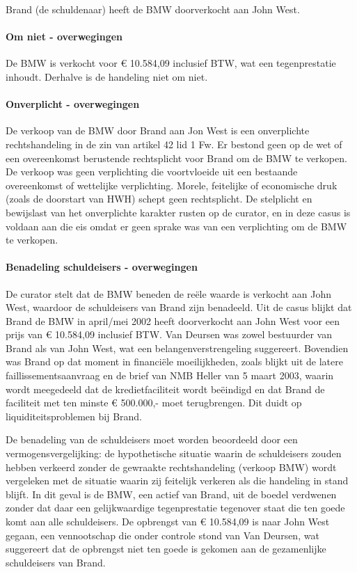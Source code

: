 \documentclass[
  dutch,
  a4paper,
]{article}
\begin{document}
Brand (de schuldenaar) heeft de BMW doorverkocht aan John West.

\paragraph{Om niet - overwegingen}\label{om-niet---overwegingen-60}

De BMW is verkocht voor € 10.584,09 inclusief BTW, wat een tegenprestatie inhoudt. Derhalve is de handeling niet om niet.

\paragraph{Onverplicht - overwegingen}\label{onverplicht---overwegingen-60}

De verkoop van de BMW door Brand aan Jon West is een onverplichte rechtshandeling in de zin van artikel 42 lid 1 Fw. Er bestond geen op de wet of een overeenkomst berustende rechtsplicht voor Brand om de BMW te verkopen. De verkoop was geen verplichting die voortvloeide uit een bestaande overeenkomst of wettelijke verplichting. Morele, feitelijke of economische druk (zoals de doorstart van HWH) schept geen rechtsplicht. De stelplicht en bewijslast van het onverplichte karakter rusten op de curator, en in deze casus is voldaan aan die eis omdat er geen sprake was van een verplichting om de BMW te verkopen.

\paragraph{Benadeling schuldeisers - overwegingen}\label{benadeling-schuldeisers---overwegingen-60}

De curator stelt dat de BMW beneden de reële waarde is verkocht aan John West, waardoor de schuldeisers van Brand zijn benadeeld. Uit de casus blijkt dat Brand de BMW in april/mei 2002 heeft doorverkocht aan John West voor een prijs van € 10.584,09 inclusief BTW. Van Deursen was zowel bestuurder van Brand als van John West, wat een belangenverstrengeling suggereert. Bovendien was Brand op dat moment in financiële moeilijkheden, zoals blijkt uit de latere faillissementsaanvraag en de brief van NMB Heller van 5 maart 2003, waarin wordt meegedeeld dat de kredietfaciliteit wordt beëindigd en dat Brand de faciliteit met ten minste € 500.000,- moet terugbrengen. Dit duidt op liquiditeitsproblemen bij Brand.

De benadeling van de schuldeisers moet worden beoordeeld door een vermogensvergelijking: de hypothetische situatie waarin de schuldeisers zouden hebben verkeerd zonder de gewraakte rechtshandeling (verkoop BMW) wordt vergeleken met de situatie waarin zij feitelijk verkeren als die handeling in stand blijft. In dit geval is de BMW, een actief van Brand, uit de boedel verdwenen zonder dat daar een gelijkwaardige tegenprestatie tegenover staat die ten goede komt aan alle schuldeisers. De opbrengst van € 10.584,09 is naar John West gegaan, een vennootschap die onder controle stond van Van Deursen, wat suggereert dat de opbrengst niet ten goede is gekomen aan de gezamenlijke schuldeisers van Brand.
\end{document}
